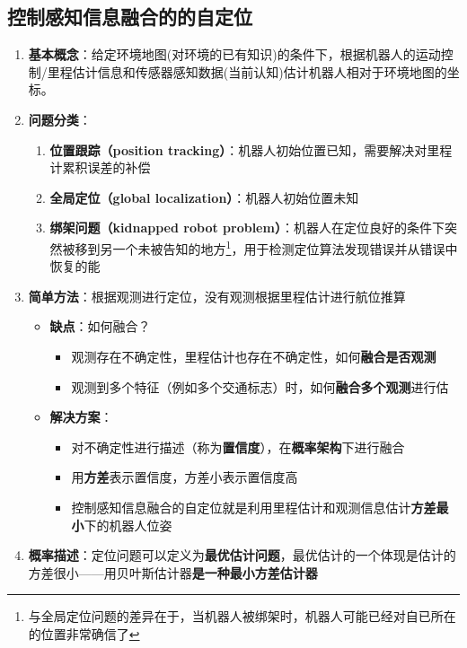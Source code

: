 \documentclass[../main.tex]{subfiles}
\begin{document}
\subsection{控制感知信息融合的的自定位}\label{sec:markov}
\begin{enumerate}
    \item \textbf{基本概念}：给定环境地图(对环境的已有知识)的条件下，根据机器人的运动控制/里程估计信息和传感器感知数据(当前认知)估计机器人相对于环境地图的坐标。
    \item \textbf{问题分类}：
    \begin{enumerate}
        \item \textbf{位置跟踪（position tracking）}：机器人初始位置已知，需要解决对里程计累积误差的补偿
        \item \textbf{全局定位（global localization）}：机器人初始位置未知
        \item \textbf{绑架问题（kidnapped robot problem）}：机器人在定位良好的条件下突然被移到另一个未被告知的地方\footnote{与全局定位问题的差异在于，当机器人被绑架时，机器人可能已经对自已所在的位置非常确信了}，用于检测定位算法发现错误并从错误中恢复的能
    \end{enumerate}
    \item \textbf{简单方法}：根据观测进行定位，没有观测根据里程估计进行航位推算
        \begin{itemize}
            \item \textbf{缺点}：如何融合？
                \begin{itemize}
                    \item 观测存在不确定性，里程估计也存在不确定性，如何\textbf{融合是否观测}
                    \item 观测到多个特征（例如多个交通标志）时，如何\textbf{融合多个观测}进行估
                \end{itemize}
            \item \textbf{解决方案}：
                \begin{itemize}
                    \item 对不确定性进行描述（称为\textbf{置信度}），在\textbf{概率架构}下进行融合
                    \item 用\textbf{方差}表示置信度，方差小表示置信度高
                    \item 控制感知信息融合的自定位就是利用里程估计和观测信息估计\textbf{方差最小}下的机器人位姿
                \end{itemize}
        \end{itemize}
    \item \textbf{概率描述}：定位问题可以定义为\textbf{最优估计问题}，最优估计的一个体现是估计的方差很小——用贝叶斯估计器\textbf{是一种最小方差估计器}\\

\end{enumerate}
\end{document}
